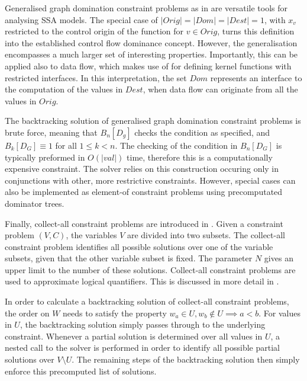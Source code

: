     Generalised graph domination constraint problems as in 
    are versatile tools for analysing SSA models.
    The special case of $|Orig|=|Dom|=|Dest|=1$, with $x_v$ restricted to the
    control origin of the function for $v\in Orig$, turns this definition
    into the established control flow dominance concept.
    However, the generalisation encompasses a much larger set of interesting
    properties.
    Importantly, this can be applied also to data flow, which
     makes use of for defining kernel functions with
    restricted interfaces.
    In this interpretation, the set $Dom$ represents an interface to the
    computation of the values in $Dest$, when data flow can originate from all
    the values in $Orig$.

    The backtracking solution of generalised graph domination constraint
    problems is brute force, meaning that $B_n[D_g]$ checks the condition
    as specified, and $B_k[D_G]\equiv 1$ for all $1\leq k<n$.
    The checking of the condition in $B_n[D_G]$ is typically preformed in
    $O(|val|)$ time, therefore this is a computationally expensive constraint.
    The solver relies on this construction occuring only in conjunctions with
    other, more restrictive constraints.
    However, special cases can also be implemented as element-of constraint
    problems using precomputated dominator trees.

    Finally, collect-all constraint problems are introduced in
    .
    Given a constraint problem $(V,C)$, the variables $V$ are divided into
    two subsets.
    The collect-all constraint problem identifies all possible solutions over
    one of the variable subsets, given that the other variable subset is fixed.
    The parameter $N$ gives an upper limit to the number of these solutions.
    Collect-all constraint problems are used to approximate logical quantifiers.
    This is discussed in more detail in .

    In order to calculate a backtracking solution of collect-all constraint
    problems, the order on $W$ needs to satisfy the property
    $w_a\in U,w_b\notin U\implies a<b$.
    For values in $U$, the backtracking solution simply passes through to the
    underlying constraint.
    Whenever a partial solution is determined over all values in $U$, a nested
    call to the solver is performed in order to identify all possible partial
    solutions over $V\setminus U$.
    The remaining steps of the backtracking solution then simply enforce this
    precomputed list of solutions.


